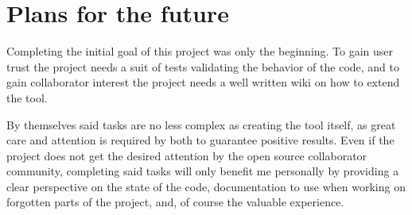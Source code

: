 \chapter{Plans for the future}

Completing the initial goal of this project was only the beginning. To gain user trust the project needs a suit of tests validating the behavior of the code, and to gain collaborator interest the project needs a well written wiki on how to extend the tool.

By themselves said tasks are no less complex as creating the tool itself, as great care and attention is required by both to guarantee positive results. Even if the project does not get the desired attention by the open source collaborator community, completing said tasks will only benefit me personally by providing a clear perspective on the state of the code, documentation to use when working on forgotten parts of the project, and, of course the valuable experience.
